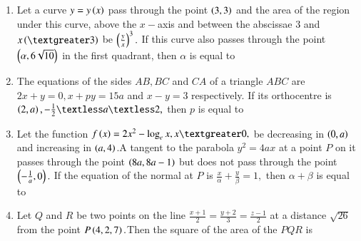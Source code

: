 \documentclass[journal,12pt,twocolumn]{IEEEtran}
\theoremstyle{remark}
\begin{document}
\begin{enumerate}
    \item Let a curve $y=y\left(x\right)$ pass through the point $\left(3,3\right)$ and the area of the region under this curve, above the $x-$axis and between the abscissae $3$ and $x\brak{\textgreater 3}$ be $\left(\frac{y}{x}\right)^3.$ If this curve also passes through the point\\ $\left(\alpha,6\sqrt{10}\right)$ in the first quadrant, then $\alpha$ is equal to\\
    \item The equations of the sides $AB,BC$ and $CA$ of a triangle $ABC$ are $2x+y=0,x+py=15a$ and $x-y=3$ respectively. If its orthocentre is $\brak{2,a},-\frac{1}{2} \textless a \textless 2,$ then $p$ is equal to\\
    \item Let the function $f\brak{x}=2x^2-\log_e{x},x\textgreater0,$ be decreasing in $\left(0,a\right)$ and increasing in $\left(a,4\right)$.A tangent to the parabola $y^2=4ax$ at a point $P$ on it passes through the point $\left(8a,8a-1\right)$ but does not pass through the point $\left(-\frac{1}{a},0\right).$ If the equation of the normal at $P$ is $\frac{x}{\alpha}+\frac{y}{\beta}=1,$ then $\alpha+\beta$ is equal to\\
    \item Let $Q$ and $R$ be two points on the line $\frac{x+1}{2}=\frac{y+2}{3}=\frac{z-1}{2}$ at a distance $\sqrt{26}$ from the point $P\left(4,2,7\right).$Then the square of the area of the $PQR$ is
\end{enumerate}
\end{document}
